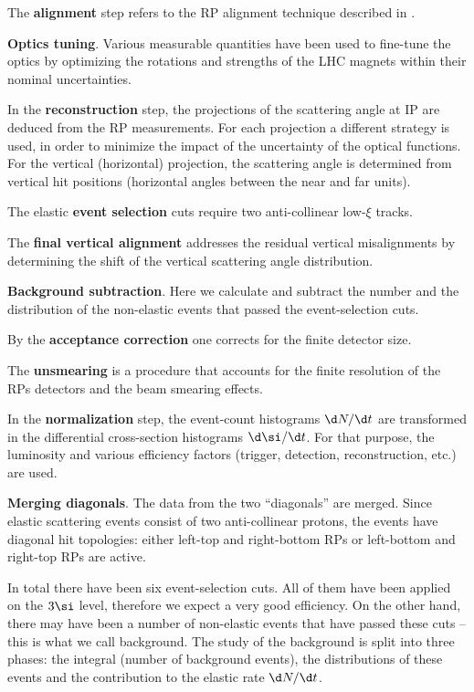 \> The {\bf alignment} step refers to the RP alignment technique described in .

\> {\bf Optics tuning}. Various measurable quantities have been used to fine-tune the optics by optimizing the rotations and strengths of the LHC magnets within their nominal uncertainties.

\> In the {\bf reconstruction} step, the projections of the scattering angle at IP are deduced from the RP measurements. For each projection a different strategy is used, in order to minimize the impact of the uncertainty of the optical functions. For the vertical (horizontal) projection, the scattering angle is determined from vertical hit positions (horizontal angles between the near and far units).

\> The elastic {\bf event selection} cuts require two anti-collinear low-$\xi$ tracks.

\> The {\bf final vertical alignment} addresses the residual vertical misalignments by determining the shift of the vertical scattering angle distribution.

\> {\bf Background subtraction}. Here we calculate and subtract the number and the distribution of the non-elastic events that passed the event-selection cuts.

\> By the {\bf acceptance correction} one corrects for the finite detector size.

\> The {\bf unsmearing} is a procedure that accounts for the finite resolution of the RPs detectors and the beam smearing effects.

\> In the {\bf normalization} step, the event-count histograms $\d N/\d t$ are transformed in the differential cross-section histograms $\d\si/\d t$. For that purpose, the luminosity and various efficiency factors (trigger, detection, reconstruction, etc.) are used.

\> {\bf Merging diagonals}. The data from the two ``diagonals'' are merged. Since elastic scattering events consist of two anti-collinear protons, the events have diagonal hit topologies: either left-top and right-bottom RPs or left-bottom and right-top RPs are active.

\vskip1mm

In total there have been six event-selection cuts. All of them have been applied on the $3\si$ level, therefore we expect a very good efficiency. On the other hand, there may have been a number of non-elastic events that have passed these cuts -- this is what we call background. The study of the background is split into three phases: the integral (number of background events), the distributions of these events and the contribution to the elastic rate $\d N/\d t$.

